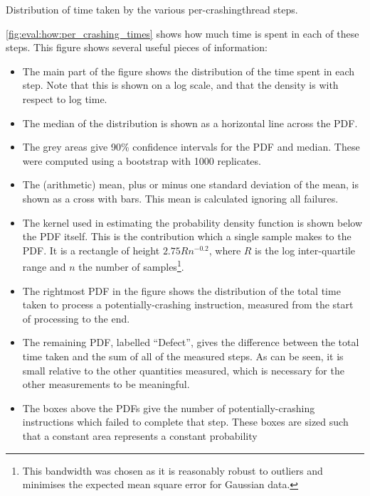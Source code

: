 \begin{sanefig}
  \centerline{
  }
  \caption{Distribution of time taken by the various
    per-\gls{crashingthread} steps. \label{fig:eval:how:per_crashing_times}}
\end{sanefig}

\autoref{fig:eval:how:per_crashing_times} shows how much time is spent
in each of these steps.  This figure shows several useful pieces of
information:
\begin{itemize}
\item The main part of the figure shows the distribution of the time
  spent in each step.  Note that this is shown on a log scale, and
  that the density is with respect to log time.
\item The median of the distribution is shown as a horizontal line
  across the PDF.
\item The grey areas give 90\% confidence intervals for the PDF and
  median.  These were computed using a bootstrap with 1000 replicates.
\item The (arithmetic) mean, plus or minus one standard deviation of
  the mean, is shown as a cross with bars.  This mean is calculated
  ignoring all failures.  
\item The kernel used in estimating the probability density function
  is shown below the PDF itself.  This is the contribution which a
  single sample makes to the PDF.  It is a rectangle of height
  $2.75Rn^{-0.2}$, where $R$ is the log inter-quartile range and $n$
  the number of samples\footnote{This bandwidth was chosen as it is
    reasonably robust to outliers and minimises the expected mean
    square error for Gaussian data.}.
\item The rightmost PDF in the figure shows the distribution of the
  total time taken to process a potentially-crashing instruction,
  measured from the start of processing to the end.
\item The remaining PDF, labelled ``Defect'', gives the difference
  between the total time taken and the sum of all of the measured
  steps.  As can be seen, it is small relative to the other quantities
  measured, which is necessary for the other measurements to be
  meaningful.
\item The boxes above the PDFs give the number of potentially-crashing
  instructions which failed to complete that step.  These boxes are
  sized such that a constant area represents a constant probability

\end{itemize}
